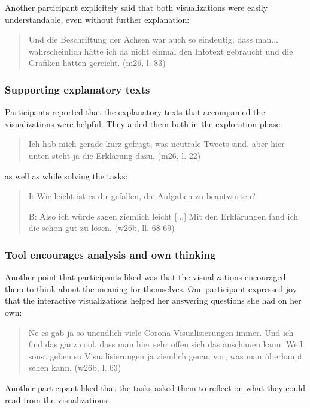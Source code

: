Another participant explicitely said that both visualizations were easily understandable, even without further explanation:

\begin{quote}
    Und die Beschriftung der Achsen war auch so eindeutig, dass man... wahrscheinlich hätte ich da nicht einmal den Infotext gebraucht und die Grafiken hätten gereicht. (m26, l. 83)
\end{quote}

\subsubsection*{Supporting explanatory texts}
Participants reported that the explanatory texts that accompanied the visualizations were helpful. They aided them both in the exploration phase:

\begin{quote}
    Ich hab mich gerade kurz gefragt, was neutrale Tweets sind, aber hier unten steht ja die Erklärung dazu. (m26, l. 22)
\end{quote}

as well as while solving the tasks:

\begin{quote}
    I: Wie leicht ist es dir gefallen, die Aufgaben zu beantworten?

    B: Also ich würde sagen ziemlich leicht [...] Mit den Erklärungen fand ich die schon gut zu lösen. (w26b, ll. 68-69)
\end{quote}

\subsubsection*{Tool encourages analysis and own thinking}
Another point that participants liked was that the visualizations encouraged them to think about the meaning for themselves. One participant expressed joy that the interactive visualizations helped her answering questions she had on her own:

\begin{quote}
    Ne es gab ja so unendlich viele Corona-Visualisierungen immer. Und ich find das ganz cool, dass man hier sehr offen sich das anschauen kann. Weil sonst geben so Visualisierungen ja ziemlich genau vor, was man überhaupt sehen kann. (w26b, l. 63)
\end{quote}

Another participant liked that the tasks asked them to reflect on what they could read from the visualizations:

